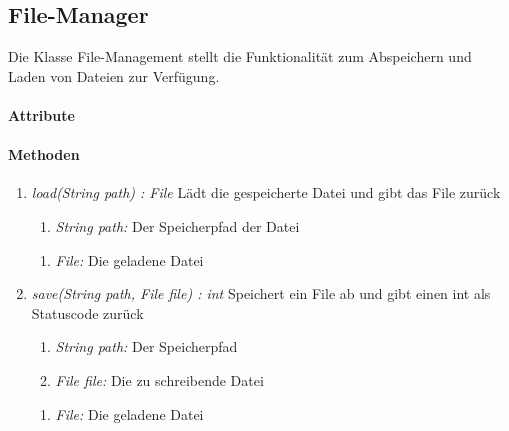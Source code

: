 \subsection{File-Manager}
Die Klasse File-Management stellt die Funktionalität zum Abspeichern und Laden von Dateien zur Verfügung.

\paragraph{Attribute}

\paragraph{Methoden}

\begin{enumerate}[+]
	\item \textit{load(String path) : File} Lädt die gespeicherte Datei und gibt das File zurück
	\begin{enumerate}[$\bullet$]
	\item \textit{String path:} Der Speicherpfad der Datei
	\end{enumerate}
	\begin{enumerate}[$\circ$]
		\item \textit{File:} Die geladene Datei
	\end{enumerate}
	\item \textit{save(String path, File file) : int} Speichert ein File ab und gibt einen int als Statuscode zurück
	\begin{enumerate}[$\bullet$]
		\item \textit{String path:} Der Speicherpfad
		\item \textit{File file:} Die zu schreibende Datei
	\end{enumerate}
	\begin{enumerate}[$\circ$]
	\item \textit{File:} Die geladene Datei
	\end{enumerate}
\end{enumerate}